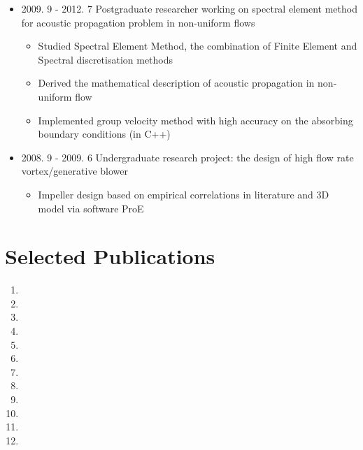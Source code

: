 \documentclass[letterpaper]{article}
\def\name{Yang Wang}
\begin{document}
\begin{itemize}
\item 2009. 9 - 2012. 7  \hspace{2pt} Postgraduate researcher working on spectral element method for acoustic propagation problem in non-uniform flows
		\begin{itemize}
		\item Studied Spectral Element Method, the combination of Finite Element and Spectral discretisation methods%
		\item	Derived the mathematical description of acoustic propagation in non-uniform flow
		\item	Implemented group velocity method with high accuracy on the absorbing boundary conditions (in C++)
		\end{itemize}

\item 2008. 9 - 2009. 6  \hspace{2pt} Undergraduate research project: the design of high flow rate vortex/generative blower
		\begin{itemize}
		\item Impeller design based on empirical correlations in literature and 3D model via software ProE
		\end{itemize}
		
\end{itemize}

\vspace{-12pt}
\section*{Selected Publications}
\vspace{-10pt}





\begin{enumerate}
\item {}
\item {}
\item {}
\item {}
\item {}
\item {}
\item {}
\item {}
\item {}
\item {}
\item {}
\item {}

\end{enumerate}
\end{document}
